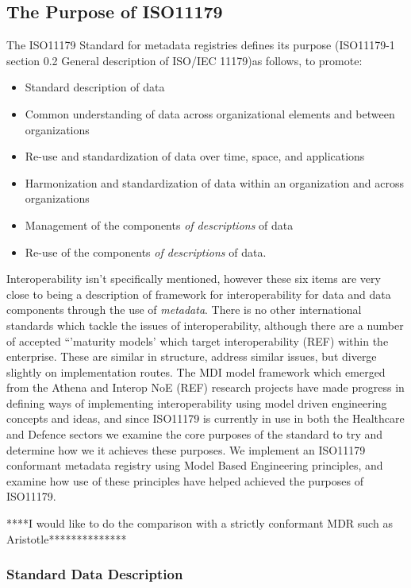 \documentclass{llncs}
\begin{document}
\subsection{The Purpose of ISO11179}

The ISO11179 Standard for metadata registries defines its purpose (ISO11179-1 section 0.2 General description of ISO/IEC 11179)as follows,
\newline
to promote:
\begin{itemize}
\item Standard description of data
\item Common understanding of data across organizational elements and between organizations
\item Re-use and standardization of data over time, space, and applications
\item Harmonization and standardization of data within an organization and across organizations
\item Management of the components \emph{of descriptions} of data
\item Re-use of the components \emph{of descriptions} of data.
\end{itemize}

Interoperability isn't specifically mentioned, however these six items are very close to being a description of framework for interoperability for data and data components through the use of \emph{metadata}. There is no other international standards which tackle the issues of interoperability, although there are a number of accepted ``'maturity models' which target interoperability (REF) within the enterprise. These are similar in structure, address similar issues, but diverge slightly on implementation routes. The MDI model framework which emerged from the Athena and Interop NoE (REF) research projects have made progress in defining ways of implementing interoperability using model driven engineering concepts and ideas, and since ISO11179 is currently in use in both the Healthcare and Defence sectors we examine the core purposes of the standard to try and determine how we it achieves these purposes. We implement an ISO11179 conformant metadata registry using Model Based Engineering principles, and examine how use of these principles have helped achieved the purposes of ISO11179. 

****I would like to do the comparison with a strictly conformant MDR such as Aristotle**************

\subsubsection{Standard Data Description}
\end{document}
